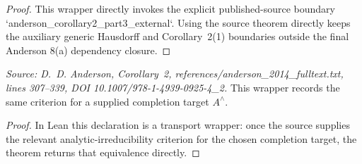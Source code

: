 \begin{proof}
  This wrapper directly invokes the explicit published-source boundary
  `anderson_corollary2_part3_external`.  Using the source theorem directly
  keeps the auxiliary generic Hausdorff and Corollary~2(1) boundaries outside
  the final Anderson 8(a) dependency closure.
\end{proof}

\begin{lemma}
  \label{lem:dimension_one_weak_criterion}
  \textit{Source: D.~D. Anderson, Corollary~2,
  references/anderson\_2014\_fulltext.txt, lines 307--339,
  DOI 10.1007/978-1-4939-0925-4\_2.}
  This wrapper records the same criterion for a supplied completion target
  \(A^\wedge\).
\end{lemma}

\begin{proof}
  In Lean this declaration is a transport wrapper: once the source supplies
  the relevant analytic-irreducibility criterion for the chosen completion
  target, the theorem returns that equivalence directly.
\end{proof}

